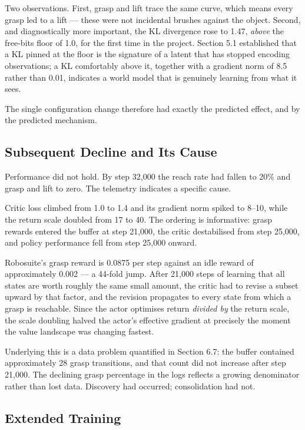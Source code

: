 \documentclass[12pt,a4paper,oneside]{report}
\begin{document}
Two observations. First, grasp and lift trace the same curve, which means every
grasp led to a lift --- these were not incidental brushes against the object.
Second, and diagnostically more important, the KL divergence rose to 1.47,
\emph{above} the free-bits floor of 1.0, for the first time in the project. Section
5.1 established that a KL pinned at the floor is the signature of a latent that
has stopped encoding observations; a KL comfortably above it, together with a
gradient norm of 8.5 rather than 0.01, indicates a world model that is genuinely
learning from what it sees.

The single configuration change therefore had exactly the predicted effect, and
by the predicted mechanism.

\hypertarget{subsequent-decline-and-its-cause}{%
\subsection{Subsequent Decline and Its Cause}\label{subsequent-decline-and-its-cause}}

Performance did not hold. By step 32,000 the reach rate had fallen to 20\% and
grasp and lift to zero. The telemetry indicates a specific cause.

Critic loss climbed from 1.0 to 1.4 and its gradient norm spiked to 8--10, while
the return scale doubled from 17 to 40. The ordering is informative: grasp
rewards entered the buffer at step 21,000, the critic destabilised from step
25,000, and policy performance fell from step 25,000 onward.

Robosuite's grasp reward is 0.0875 per step against an idle reward of
approximately 0.002 --- a 44-fold jump. After 21,000 steps of learning that all
states are worth roughly the same small amount, the critic had to revise a
subset upward by that factor, and the revision propagates to every state from
which a grasp is reachable. Since the actor optimises return \emph{divided by} the
return scale, the scale doubling halved the actor's effective gradient at
precisely the moment the value landscape was changing fastest.

Underlying this is a data problem quantified in Section 6.7: the buffer
contained approximately 28 grasp transitions, and that count did not increase
after step 21,000. The declining grasp percentage in the logs reflects a growing
denominator rather than lost data. Discovery had occurred; consolidation had
not.

\hypertarget{extended-training}{%
\subsection{Extended Training}\label{extended-training}}
\end{document}

